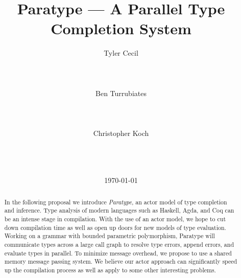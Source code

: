 \documentclass{acm_proc_article-sp}
\begin{document}
\title{Paratype --- A Parallel Type Completion System}


\author{
\alignauthor
Tyler Cecil\\
       \\
       \\
       \\
\alignauthor
Ben Turrubiates\\
       \\
       \\
       \\
\alignauthor
Christopher Koch\\
       \\
       \\
       \\
}
\date{\today}

\maketitle
\begin{abstract}
  In the following proposal we introduce \emph{Paratype}, an actor model of
  type completion and inference. Type analysis of modern languages such as
  Haskell, Agda, and Coq can be an intense stage in compilation. With the use
  of an actor model, we hope to cut down compilation time as well as open up
  doors for new models of type evaluation. Working on a grammar with bounded
  parametric polymorphism, Paratype will communicate types across a large call
  graph to resolve type errors, append errors, and evaluate types in parallel.
  To minimize message overhead, we propose to use a shared memory message
  passing system. We believe our actor approach can significantly
  speed up the compilation process as well as apply to some other interesting
  problems.
\end{abstract}

\end{document}
